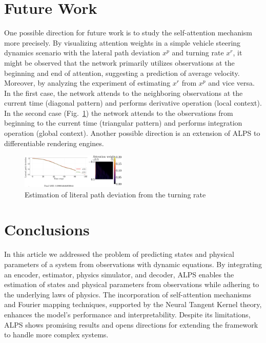 \documentclass[acmtog]{techreportacmart}
\begin{document}
\section{Future Work}
One possible direction for future work is to study the self-attention mechanism more precisely. By visualizing attention weights in a simple vehicle steering dynamics scenario with the lateral path deviation ${x^{p}}$ and turning rate ${x^{r}}$, it might be observed that the network primarily utilizes observations at the beginning and end of attention, suggesting a prediction of average velocity. Moreover, by analyzing the experiment of estimating ${x^{r}}$ from ${x^{p}}$ and vice versa. In the first case, the network attends to the neighboring
observations at the current time (diagonal pattern) and performs derivative operation (local context). In the second case (Fig.~\ref{fig:integration}) the network attends to the observations from beginning to the current time (triangular pattern) and performs integration operation (global context).
Another possible direction is an extension of ALPS to differentiable rendering engines.
\begin{figure}
  \centering
  \includegraphics[width=0.45\textwidth]{integration}
  \caption{Estimation of literal path deviation from the turning rate}
  \label{fig:integration}
\end{figure}
\section{Conclusions}
In this article we addressed the problem of predicting states and physical parameters of a system from observations with dynamic equations. By integrating an encoder, estimator, physics simulator, and decoder, ALPS enables the estimation of states and physical parameters from observations while adhering to the underlying laws of physics. The incorporation of self-attention mechanisms and Fourier mapping techniques, supported by the Neural Tangent Kernel theory, enhances the model's performance and interpretability. Despite its limitations, ALPS shows promising results and opens directions for extending the framework to handle more complex systems.



\end{document}
